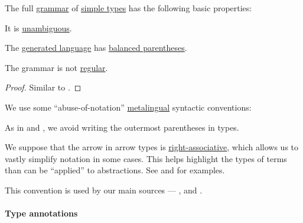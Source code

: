 \begin{proposition}\label{thm:simple_type_grammar}
  The full \hyperref[def:formal_grammar]{grammar} of \hyperref[def:simple_type]{simple types} has the following basic properties:
  \begin{thmenum}
     It is \hyperref[def:grammar_ambiguity]{unambiguous}.

     The \hyperref[def:formal_grammar/language]{generated language} has \hyperref[def:paired_delimiters]{balanced parentheses}.

     The grammar is not \hyperref[def:chomsky_hierarchy/regular]{regular}.
  \end{thmenum}
\end{proposition}
\begin{proof}
  Similar to .
\end{proof}

\begin{remark}\label{rem:simple_type_parentheses}
  We use some \enquote{abuse-of-notation} \hyperref[con:metalogic]{metalingual} syntactic conventions:
  \begin{thmenum}
     As in  and , we avoid writing the outermost parentheses in types.

     We suppose that the arrow in arrow types is \hyperref[rem:binary_operation_syntax_trees/associativity]{right-associative}, which allows us to vastly simplify notation in some cases. This helps highlight the types of terms than can be \enquote{applied} to abstractions. See  and  for examples.

    This convention is used by our main sources --- ,  and .
  \end{thmenum}
\end{remark}

\paragraph{Type annotations}

